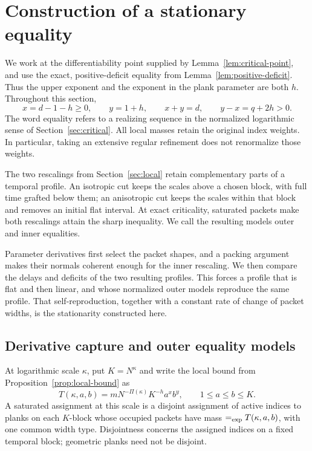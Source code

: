 \section{Construction of a stationary equality}
\label{sec:stationary}

We work at the differentiability point supplied by
Lemma~\ref{lem:critical-point}, and use the exact, positive-deficit equality
from Lemma~\ref{lem:positive-deficit}. Thus the upper exponent and the
exponent in the plank parameter are both $h$. Throughout this section,
\[
 x=d-1-h\ge0,\qquad y=1+h,\qquad x+y=d,
 \qquad y-x=q+2h>0.
\]
The word equality refers to a realizing sequence in the normalized
logarithmic sense of Section~\ref{sec:critical}. All local masses retain the
original index weights. In particular, taking an extensive regular refinement does not
renormalize those weights.

The two rescalings from Section~\ref{sec:local} retain complementary
parts of a temporal profile. An isotropic cut keeps the scales above a
chosen block, with full time grafted below them; an anisotropic cut keeps
the scales within that block and removes an initial flat interval. At
exact criticality, saturated packets make both rescalings attain the
sharp inequality. We call the resulting models outer and inner equalities.

Parameter derivatives first select the packet shapes, and a packing
argument makes their normals coherent enough for the inner rescaling.
We then compare the delays and deficits of the two resulting profiles.
This forces a profile that is flat and then linear, and whose normalized
outer models reproduce the same profile. That self-reproduction, together
with a constant rate of change of packet widths, is the stationarity
constructed here.

\subsection{Derivative capture and outer equality models}

At logarithmic scale $\kappa$, put $K=N^\kappa$ and write the local bound from
Proposition~\ref{prop:local-bound} as
\begin{equation}
 T(\kappa,a,b)
 =mN^{-\Pi(\kappa)}K^{-h}a^xb^y,
 \qquad 1\le a\le b\le K.
 \label{eq:stationary-local-threshold}
\end{equation}
A saturated assignment at this scale is a disjoint assignment of active
indices to planks on each $K$-block whose occupied packets have mass
$\mathrel{=_{\mathrm{exp}}} T(\kappa,a,b)$, with one common width type. Disjointness concerns
the assigned indices on a fixed temporal block; geometric planks need not
be disjoint.

